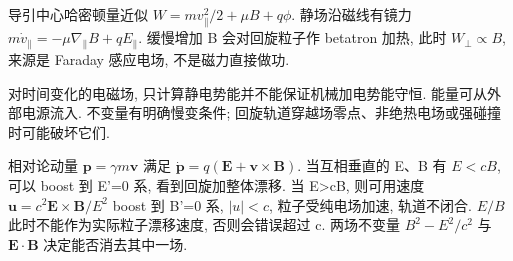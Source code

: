导引中心哈密顿量近似 $W=m v_\parallel^2/2+\mu B+q\phi$. 静场沿磁线有镜力 $m\dot v_\parallel=-\mu\nabla_\parallel B+qE_\parallel$. 缓慢增加 B 会对回旋粒子作 betatron 加热, 此时 \(W_\perp\propto B\), 来源是 Faraday 感应电场, 不是磁力直接做功.

对时间变化的电磁场, 只计算静电势能并不能保证机械加电势能守恒. 能量可从外部电源流入. 不变量有明确慢变条件; 回旋轨道穿越场零点、非绝热电场或强碰撞时可能破坏它们.

相对论动量 $\mathbf p=\gamma m\mathbf v$ 满足 $\dot{\mathbf p}=q(\mathbf E+\mathbf v\times\mathbf B)$. 当互相垂直的 E、B 有 $E<cB$, 可以 boost 到 E'=0 系, 看到回旋加整体漂移. 当 E>cB, 则可用速度 $\mathbf u=c^2\mathbf E\times\mathbf B/E^2$ boost 到 B'=0 系, $|u|<c$, 粒子受纯电场加速, 轨道不闭合. $E/B$ 此时不能作为实际粒子漂移速度, 否则会错误超过 c. 两场不变量 $B^2-E^2/c^2$ 与 $\mathbf E\cdot\mathbf B$ 决定能否消去其中一场.
